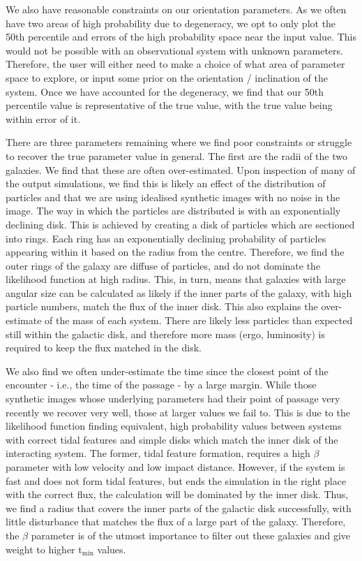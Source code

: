 We also have reasonable constraints on our orientation parameters. As we often have two areas of high probability due to degeneracy, we opt to only plot the 50th percentile and errors of the high probability space near the input value. This would not be possible with an observational system with unknown parameters. Therefore, the user will either need to make a choice of what area of parameter space to explore, or input some prior on the orientation / inclination of the system. Once we have accounted for the degeneracy, we find that our 50th percentile value is representative of the true value, with the true value being within error of it. 

There are three parameters remaining where we find poor constraints or struggle to recover the true parameter value in general. The first are the radii of the two galaxies. We find that these are often over-estimated. Upon inspection of many of the output simulations, we find this is likely an effect of the distribution of particles and that we are using idealised synthetic images with no noise in the image. The way in which the particles are distributed is with an exponentially declining disk. This is achieved by creating a disk of particles which are sectioned into rings. Each ring has an exponentially declining probability of particles appearing within it based on the radius from the centre. Therefore, we find the outer rings of the galaxy are diffuse of particles, and do not dominate the likelihood function at high radius. This, in turn, means that galaxies with large angular size can be calculated as likely if the inner parts of the galaxy, with high particle numbers, match the flux of the inner disk. This also explains the over-estimate of the mass of each system. There are likely less particles than expected still within the galactic disk, and therefore more mass (ergo, luminosity) is required to keep the flux matched in the disk.

We also find we often under-estimate the time since the closest point of the encounter - i.e., the time of the passage - by a large margin. While those synthetic images whose underlying parameters had their point of passage very recently we recover very well, those at larger values we fail to. This is due to the likelihood function finding equivalent, high probability values between systems with correct tidal features and simple disks which match the inner disk of the interacting system. The former, tidal feature formation, requires a high $\beta$ parameter with low velocity and low impact distance. However, if the system is fast and does not form tidal features, but ends the simulation in the right place with the correct flux, the calculation will be dominated by the inner disk. Thus, we find a radius that covers the inner parts of the galactic disk successfully, with little disturbance that matches the flux of a large part of the galaxy. Therefore, the $\beta$ parameter is of the utmost importance to filter out these galaxies and give weight to higher t$_{\mathrm{min}}$ values.

